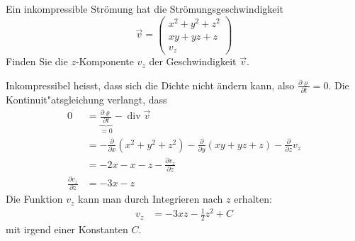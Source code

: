 Ein inkompressible Strömung hat die Strömungsgeschwindigkeit
\[
\vec v = \begin{pmatrix}
x^2+y^2+z^2
\\
xy+yz+z
\\
v_z
\end{pmatrix}
\]
Finden Sie die $z$-Komponente $v_z$ der Geschwindigkeit $\vec v$.

\begin{loesung}
Inkompressibel heisst, dass sich die Dichte nicht ändern kann, also
$\frac{\partial\varrho}{\partial t}=0$.
Die Kontinuit"atsgleichung verlangt, dass
\begin{align*}
0
&=
\underbrace{\frac{\partial\varrho}{\partial t}}_{=0}-\operatorname{div}\vec v
\\
&=
-\frac{\partial}{\partial x}(x^2+y^2+z^2)
-\frac{\partial}{\partial y}(xy+yz+z)
-\frac{\partial}{\partial z}v_z
\\
&=
-2x-x-z-\frac{\partial v_z}{\partial z}
\\
\frac{\partial v_z}{\partial z}
&=
-3x-z
\end{align*}
Die Funktion $v_z$ kann man durch Integrieren nach $z$ erhalten:
\begin{align*}
v_z
&=
-3xz-\frac12z^2+C
\end{align*}
mit irgend einer Konstanten $C$.
\end{loesung}

